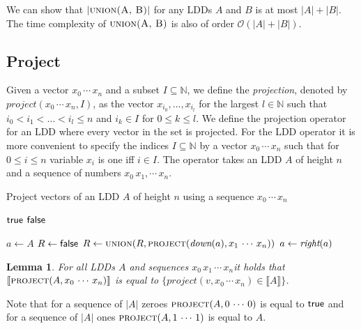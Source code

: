 \documentclass{article}
\newtheorem{lemma}[theorem]{Lemma}
\newcommand{\var}[1]{\ensuremath{\textit{#1}}}
\newcommand{\interpret}[1]{\llbracket #1 \rrbracket}
\begin{document}
We can show that $|\textsc{union(A, B)}|$ for any LDDs $A$ and $B$ is at most $|A| + |B|$.
The time complexity of $\textsc{union(A, B)}$ is also of order $\mathcal{O}(|A| + |B|)$.

\subsection{Project}

Given a vector $x_0\,\cdots\,x_n$ and a subset $I \subseteq \mathbb{N}$, we define the \emph{projection}, denoted by $\textit{project}(x_0\,\cdots\,x_n, I)$, as the vector $x_{i_0}, \ldots, x_{i_l}$ for the largest $l \in \mathbb{N}$ such that $i_0 < i_1 < \ldots < i_l \leq n$ and $i_k \in I$ for $0 \leq k \leq l$.
We define the projection operator for an LDD where every vector in the set is projected.
For the LDD operator it is more convenient to specify the indices $I \subseteq \mathbb{N}$ by a vector $x_0\,\cdots\,x_n$ such that for $0 \leq i \leq n$ variable $x_i$ is one iff $i \in I$.
The operator takes an LDD $A$ of height $n$ and a sequence of numbers $x_0\,x_1,\cdots\,x_n$.

\begin{algorithm}[h]
\caption{Project vectors of an LDD $\var{A}$ of height $n$ using a sequence $x_0\,\cdots\,x_n$}
\begin{algorithmic}[1]
		\State \Return $\textsf{true}$
		\State \Return $\textsf{false}$
	\EndIf
	
		\State {}
		\State $a \gets A$
		\State $R \gets \textsf{false}$
			\State $R \gets \textsc{union}(R, \textsc{project}(\textit{down}(a), x_1\,\cdots\,x_n))$
			\State $a \gets \textit{right}(a)$		
		\EndWhile			
		\State {}
	\EndIf

\EndFunction
\end{algorithmic}
\end{algorithm}

\begin{lemma}
	For all LDDs $A$ and sequences $x_0\,x_1\,\cdots\,x_n $it holds that $\interpret{\textsc{project}(A, x_0\,\cdots\,x_n)}$ is equal to $\{\textit{project}(v, x_0\,\cdots\,x_n) \in \interpret{A}\}$.
\end{lemma}

Note that for a sequence of $|A|$ zeroes $\textsc{project}(A, 0\,\cdots\,0)$ is equal to $\textsf{true}$ and for a sequence of $|A|$ ones $\textsc{project}(A, 1\,\cdots\,1)$ is equal to $A$.
\end{document}
